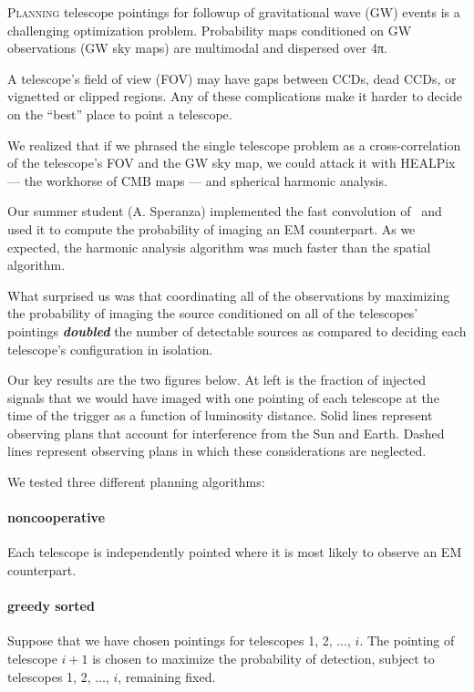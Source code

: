 \documentclass[portrait]{a0poster}
\newcommand{\dropcap}[2]{\lettrine{\fontspec{Copse}#1}{\textnormal{#2}}}
\renewcommand{\emph}[1]{{\bfseries\itshape#1}}
\begin{document}
\framebreak

\dropcap{P}{lanning} telescope pointings for followup of gravitational wave (GW) events is a challenging optimization problem.  Probability maps conditioned on GW observations (GW sky maps) are multimodal and dispersed over 4π.

A telescope’s field of view (FOV) may have gaps between CCDs, dead CCDs, or vignetted or clipped regions.  Any of these complications make it harder to decide on the “best” place to point a telescope.

We realized that if we phrased the single telescope problem as a cross-correlation of the telescope’s FOV and the GW sky map, we could attack it with HEALPix --- the workhorse of CMB maps --- and spherical harmonic analysis.

Our summer student (A. Speranza) implemented the fast convolution of~\citet{Wandelt:2001p13439} and used it to compute the probability of imaging an EM counterpart.  As we expected, the harmonic analysis algorithm was much faster than the spatial algorithm.

What surprised us was that coordinating all of the observations by maximizing the probability of imaging the source conditioned on all of the telescopes’ pointings \emph{doubled} the number of detectable sources as compared to deciding each telescope’s configuration in isolation.

\framebreak

Our key results are the two figures below.  At left is the fraction of injected signals that we would have imaged with one pointing of each telescope at the time of the trigger as a function of luminosity distance.  Solid lines represent observing plans that account for interference from the Sun and Earth.  Dashed lines represent observing plans in which these considerations are neglected.

We tested three different planning algorithms:

\paragraph{\color{red}noncooperative}
Each telescope is independently pointed where it is most likely to observe an EM counterpart.

\paragraph{\color{green!50!black}greedy sorted}
Suppose that we have chosen pointings for telescopes 1, 2, $\dots$, $i$.  The pointing of telescope $i+1$ is chosen to maximize the probability of detection, subject to telescopes 1, 2, $\dots$, $i$, remaining fixed.
\end{document}
